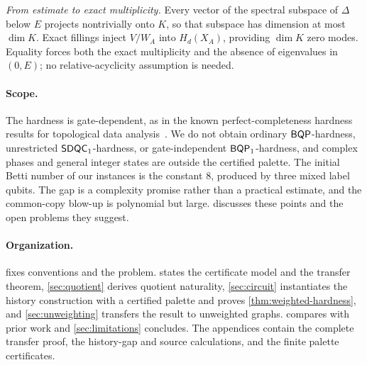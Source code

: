 \emph{From estimate to exact multiplicity.} Every vector of the spectral subspace of \(\Delta\) below \(E\) projects nontrivially onto \(K\), so that subspace has dimension at most \(\dim K\). Exact fillings inject \(V/W_A\) into \(H_d(X_A)\), providing \(\dim K\) zero modes. Equality forces both the exact multiplicity and the absence of eigenvalues in \((0,E)\); no relative-acyclicity assumption is needed.

\paragraph{Scope.}
The hardness is gate-dependent, as in the known perfect-completeness hardness results for topological data analysis~\cite{crichigno2024clique,king2026gapped,gyurik2026provable}. We do not obtain ordinary \(\mathsf{BQP}\)-hardness, unrestricted \(\mathsf{SDQC}_{1}\)-hardness, or gate-independent \(\mathsf{BQP}_{1}\)-hardness, and complex phases and general integer states are outside the certified palette. The initial Betti number of our instances is the constant \(8\), produced by three mixed label qubits. The gap is a complexity promise rather than a practical estimate, and the common-copy blow-up is polynomial but large.  discusses these points and the open problems they suggest.

\paragraph{Organization.}
 fixes conventions and the problem.  states the certificate model and the transfer theorem, \cref{sec:quotient} derives quotient naturality, \cref{sec:circuit} instantiates the history construction with a certified palette and proves \cref{thm:weighted-hardness}, and \cref{sec:unweighting} transfers the result to unweighted graphs.  compares with prior work and \cref{sec:limitations} concludes. The appendices contain the complete transfer proof, the history-gap and source calculations, and the finite palette certificates.
